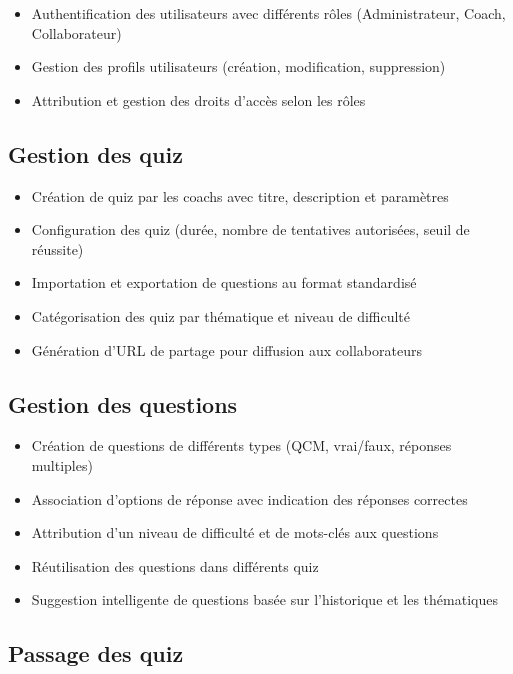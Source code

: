 \documentclass[12pt,a4paper]{report}
\begin{document}
\begin{itemize}
\item Authentification des utilisateurs avec différents rôles (Administrateur, Coach, Collaborateur)
\item Gestion des profils utilisateurs (création, modification, suppression)
\item Attribution et gestion des droits d'accès selon les rôles
\end{itemize}

\subsection{Gestion des quiz}

\begin{itemize}
\item Création de quiz par les coachs avec titre, description et paramètres
\item Configuration des quiz (durée, nombre de tentatives autorisées, seuil de réussite)
\item Importation et exportation de questions au format standardisé
\item Catégorisation des quiz par thématique et niveau de difficulté
\item Génération d'URL de partage pour diffusion aux collaborateurs
\end{itemize}

\subsection{Gestion des questions}

\begin{itemize}
\item Création de questions de différents types (QCM, vrai/faux, réponses multiples)
\item Association d'options de réponse avec indication des réponses correctes
\item Attribution d'un niveau de difficulté et de mots-clés aux questions
\item Réutilisation des questions dans différents quiz
\item Suggestion intelligente de questions basée sur l'historique et les thématiques
\end{itemize}

\subsection{Passage des quiz}
\end{document}
